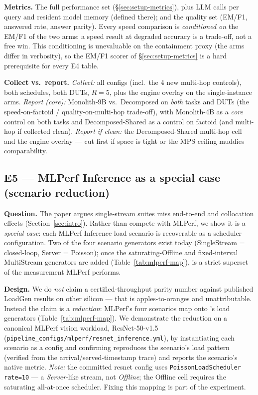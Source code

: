 \textbf{Metrics.} The full performance set (\S\ref{sec:setup-metrics}),
plus LLM calls per query and resident model memory (defined there); and
the quality set (EM/F1, answered rate, answer parity). Every speed
comparison is \emph{conditioned on} the EM/F1 of the two arms: a speed
result at degraded accuracy is a trade-off, not a free win. This
conditioning is unevaluable on the containment proxy (the arms differ in
verbosity), so the EM/F1 scorer of \S\ref{sec:setup-metrics} is a hard
prerequisite for every E4 table.

\textbf{Collect vs.\ report.} \emph{Collect:} all configs (incl.\ the 4 new
multi-hop controls), both schedules, both DUTs, $R{=}5$, plus the engine
overlay on the single-instance arms. \emph{Report (core):} Monolith-9B
vs.\ Decomposed on \emph{both} tasks and DUTs (the
speed-on-factoid / quality-on-multi-hop trade-off), with Monolith-4B as a
\emph{core} control on both tasks and Decomposed-Shared as a control on
factoid (and multi-hop if collected clean). \emph{Report if clean:} the
Decomposed-Shared multi-hop cell and the engine overlay --- cut first if
space is tight or the MPS ceiling muddies comparability.

\subsection{E5 --- MLPerf Inference as a special case (scenario reduction)}
\label{sec:e5-mlperf}

\textbf{Question.} The paper argues single-stream suites miss end-to-end
and collocation effects (Section~\ref{sec:intro}). Rather than compete with
MLPerf, we show it is a \emph{special case}: each MLPerf Inference load
scenario is recoverable as a \sysname{} scheduler configuration. Two of the
four scenario generators exist today (SingleStream = closed-loop,
Server = Poisson); once the saturating-Offline and fixed-interval
MultiStream generators are added (Table~\ref{tab:mlperf-map}), \sysname{}
is a strict superset of the measurement MLPerf performs.

\textbf{Design.} We do \emph{not} claim a certified-throughput parity
number against published LoadGen results on other silicon --- that is
apples-to-oranges and unattributable. Instead the claim is a
\emph{reduction}: MLPerf's four scenarios map onto \sysname{}'s load
generators (Table~\ref{tab:mlperf-map}). We demonstrate the reduction on a
canonical MLPerf vision workload, ResNet-50-v1.5
(\texttt{pipeline\_configs/mlperf/resnet\_inference.yml}), by instantiating
each scenario as a config and confirming \sysname{} reproduces the
scenario's load pattern (verified from the arrival/served-timestamp trace)
and reports the scenario's native metric. \emph{Note:} the committed
resnet config uses \texttt{PoissonLoadScheduler rate=10} --- a
\emph{Server}-like stream, not \emph{Offline}; the Offline cell requires
the saturating all-at-once scheduler. Fixing this mapping is part of the
experiment.

